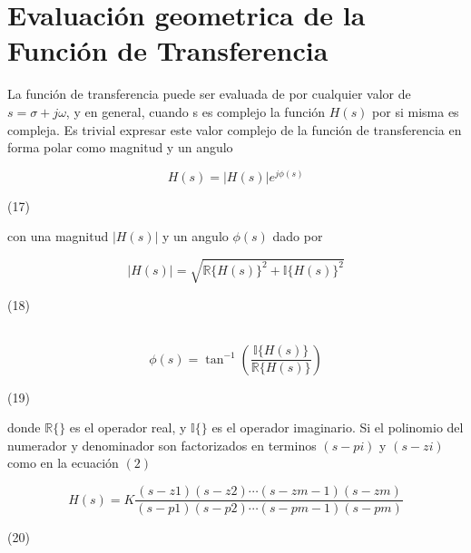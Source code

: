 \documentclass[10pt,a4paper]{article}
\begin{document}
\section{Evaluación geometrica de la Función de Transferencia}
La función de transferencia puede ser evaluada de por cualquier valor de $s=\sigma+j\omega$, y en general, cuando s es complejo la función $H(s)$ por si misma es compleja. Es trivial expresar este valor complejo de la función de transferencia en forma polar como magnitud y un angulo
\begin{center}
  \[H(s)=|H(s)|e^{j\phi(s)}\]
  \begin{minipage}{0.9\textwidth}
    \begin{flushright}
        (17)
    \end{flushright}
  \end{minipage}
\end{center}
con una magnitud $|H(s)|$ y un angulo $\phi(s)$ dado por
\begin{center}
  \[|H(s)|=\sqrt{ \mathbb{R}\{H(s)\}^{2}+ \mathbb{I}\{H(s)\}^{2}}\]
  \begin{minipage}{0.9\textwidth}
    \begin{flushright}
        (18)
    \end{flushright}
  \end{minipage}
  \\
  \[\phi(s)=\tan^{-1}\left(\frac{\mathbb{I}\{H(s)\}}{\mathbb{R}\{H(s)\}}\right)\]
  \begin{minipage}{0.9\textwidth}
    \begin{flushright}
        (19)
    \end{flushright}
  \end{minipage}
\end{center}
donde $\mathbb{R}\{\}$ es el operador real, y $\mathbb{I}\{\}$ es el operador imaginario. Si el polinomio del numerador y denominador son factorizados en terminos $(s-p{\scriptscriptstyle i})$ y $(s-z{\scriptscriptstyle i})$ como en la ecuación $(2)$
\begin{center}
  \[H(s)=K\frac{(s-z{\scriptscriptstyle 1})(s-z{\scriptscriptstyle 2})\cdots(s-z{\scriptscriptstyle m-1})(s-z{\scriptscriptstyle m})}{(s-p{\scriptscriptstyle 1})(s-p{\scriptscriptstyle 2})\cdots(s-p{\scriptscriptstyle m-1})(s-p{\scriptscriptstyle m})}\]
  \begin{minipage}{0.9\textwidth}
    \begin{flushright}
        (20)
    \end{flushright}
  \end{minipage}
\end{center}
\end{document}
